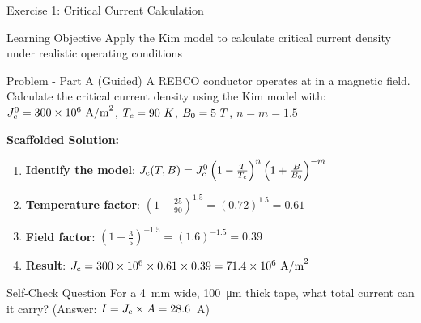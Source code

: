 \begin{frame}{Exercise 1: Critical Current Calculation}
    \begin{block}{Learning Objective}
        Apply the Kim model to calculate critical current density under realistic operating conditions
    \end{block}
    
    \begin{block}{Problem - Part A (Guided)}
        A REBCO conductor operates at  in a  magnetic field.
        Calculate the critical current density using the Kim model with:
        $J_\text{c}^0 = 300 \times 10^6~\text{A/m}^2$, $T_c = 90~K$, $B_0 = 5~T$, $n = m = 1.5$
    \end{block}
    
    \textbf{Scaffolded Solution:}
    \begin{enumerate}
        \item \textbf{Identify the model}: $J_\text{c}(T,B) = J_\text{c}^0 \left(1-\frac{T}{T_c}\right)^{n} \left(1+\frac{B}{B_0}\right)^{-m}$
        \item \textbf{Temperature factor}: $\left(1-\frac{25}{90}\right)^{1.5} = (0.72)^{1.5} = 0.61$
        \item \textbf{Field factor}: $\left(1+\frac{3}{5}\right)^{-1.5} = (1.6)^{-1.5} = 0.39$
        \item \textbf{Result}: $J_\text{c} = 300 \times 10^6 \times 0.61 \times 0.39 = 71.4 \times 10^6~\text{A/m}^2$
    \end{enumerate}
    
    \begin{alertblock}{Self-Check Question}
        For a 4~mm wide, 100~μm thick tape, what total current can it carry? (Answer: $I = J_\text{c} \times A = 28.6$~A)
    \end{alertblock}
\end{frame}

